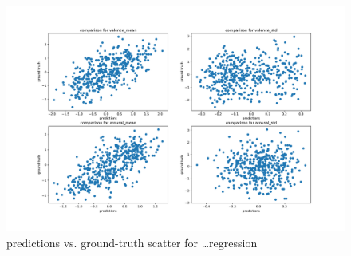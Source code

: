 \begin{figure}
	\centering
	\includegraphics[width=\linewidth]{assets/predictions-scatter.pdf}
	\caption{predictions vs. ground-truth scatter for \dots regression}
	\label{fig:eval-scatter}
\end{figure}


